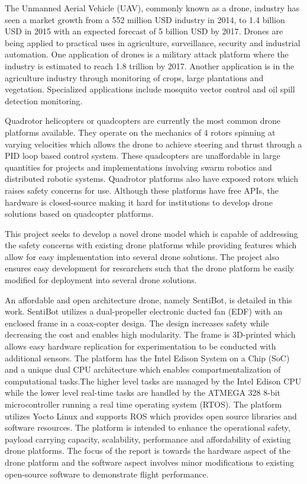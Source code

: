 \documentclass[12pt]{article}
\begin{document}
The Unmanned Aerial Vehicle (UAV), commonly known as a drone, industry has seen a market growth from a 552 million USD industry in 2014, to 1.4 billion USD in 2015 with an expected forecast of 5 billion USD by 2017\cite{legalandsocial}. Drones are being applied to practical uses in agriculture, surveillance, security and industrial automation. One application of drones is a military attack platform where the industry is estimated to reach 1.8 trillion by 2017\cite{dronewars}. Another application is in the agriculture industry through monitoring of crops, large plantations and vegetation\cite{agriculture}. Specialized applications include mosquito vector control\cite{mosquito} and oil spill detection monitoring\cite{oilspill}. 

Quadrotor helicopters or quadcopters are currently the most common drone platforms available. They operate on the mechanics of 4 rotors spinning at varying velocities which allows the drone to achieve steering and thrust through a PID loop based control system\cite{Multiwii}. These quadcopters are unaffordable in large quantities for projects and implementations involving swarm robotics and distributed robotic systems. Quadrotor platforms also have exposed rotors which raises safety concerns for use. Although these platforms have free APIs, the hardware is closed-source making it hard for institutions to develop drone solutions based on quadcopter platforms.

This project seeks to develop a novel drone model which is capable of addressing the safety concerns with existing drone platforms while providing features which allow for easy implementation into several drone solutions. The project also ensures easy development for researchers such that the drone platform be easily modified for deployment into several drone solutions.

An affordable and open architecture drone, namely SentiBot, is detailed in this work. SentiBot utilizes a dual-propeller electronic ducted fan (EDF) with an enclosed frame in a coax-copter design. The design increases safety while decreasing the cost and enables high modularity. The frame is 3D-printed which allows easy hardware replication for experimentation to be conducted with additional sensors. The platform has the Intel Edison System on a Chip (SoC) and a unique dual CPU architecture which enables compartmentalization of computational tasks.\cite{inteledison}The higher level tasks are managed by the Intel Edison CPU while the lower level real-time tasks are handled by the ATMEGA 328 8-bit microcontroller running a real time operating system (RTOS). The platform utilizes Yocto Linux and supports ROS which provides open source libraries and software resources\cite{ROS}. The platform is intended to enhance the operational safety, payload carrying capacity, scalability, performance and affordability of existing drone platforms. The focus of the report is towards the hardware aspect of the drone platform and the software aspect involves minor modifications to existing open-source software to demonstrate flight performance.
\end{document}
